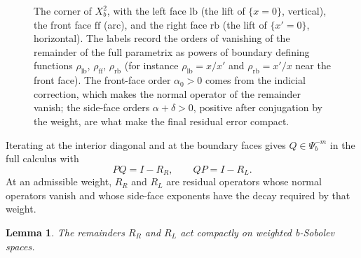 \documentclass[12pt,oneside,reqno]{article}
\theoremstyle{plain}
\newtheorem{lemma}[theorem]{Lemma}
\theoremstyle{definition}
\theoremstyle{remark}
\begin{document}
\begin{figure}[htbp]
\centering
{}
\caption[Construction of the full b-parametrix]{The corner of \(X_b^2\),
with the left face \(\mathrm{lb}\) (the lift of \(\{x=0\}\), vertical), the
front face \(\mathrm{ff}\) (arc), and the right face \(\mathrm{rb}\) (the
lift of \(\{x'=0\}\), horizontal).  The labels record the orders of
vanishing of the remainder of the full parametrix as powers of boundary
defining functions \(\rho_{\mathrm{lb}}\), \(\rho_{\mathrm{ff}}\),
\(\rho_{\mathrm{rb}}\) (for instance \(\rho_{\mathrm{lb}}=x/x'\) and
\(\rho_{\mathrm{rb}}=x'/x\) near the front face).  The front-face order
\(\alpha_0>0\) comes from the indicial correction, which makes the normal
operator of the remainder vanish; the side-face orders \(\alpha+\delta>0\),
positive after conjugation by the weight, are what make the final residual
error compact.}
\end{figure}

Iterating at the interior diagonal and at the boundary faces gives
\(Q\in\Psi_b^{-m}\) in the full calculus with
\[
 PQ=I-R_R,\qquad QP=I-R_L.
\]
At an admissible weight, \(R_R\) and \(R_L\) are residual operators whose
normal operators vanish and whose side-face exponents have the decay
required by that weight.

\begin{lemma}
The remainders \(R_R\) and \(R_L\) act compactly on weighted b-Sobolev
spaces.
\end{lemma}
\end{document}
